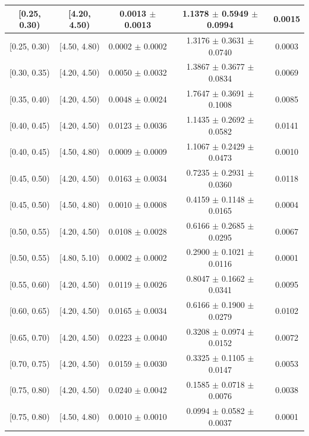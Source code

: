 \begin{longtable}{|c|c|c|c|c|}
\hline
\endlastfoot
[0.25, 0.30) & [4.20, 4.50) & 0.0013 $\pm$ 0.0013 & 1.1378 $\pm$ 0.5949 $\pm$ 0.0994 & 0.0015 \\ 
\hline
[0.25, 0.30) & [4.50, 4.80) & 0.0002 $\pm$ 0.0002 & 1.3176 $\pm$ 0.3631 $\pm$ 0.0740 & 0.0003 \\ 
\hline
[0.30, 0.35) & [4.20, 4.50) & 0.0050 $\pm$ 0.0032 & 1.3867 $\pm$ 0.3677 $\pm$ 0.0834 & 0.0069 \\ 
\hline
[0.35, 0.40) & [4.20, 4.50) & 0.0048 $\pm$ 0.0024 & 1.7647 $\pm$ 0.3691 $\pm$ 0.1008 & 0.0085 \\ 
\hline
[0.40, 0.45) & [4.20, 4.50) & 0.0123 $\pm$ 0.0036 & 1.1435 $\pm$ 0.2692 $\pm$ 0.0582 & 0.0141 \\ 
\hline
[0.40, 0.45) & [4.50, 4.80) & 0.0009 $\pm$ 0.0009 & 1.1067 $\pm$ 0.2429 $\pm$ 0.0473 & 0.0010 \\ 
\hline
[0.45, 0.50) & [4.20, 4.50) & 0.0163 $\pm$ 0.0034 & 0.7235 $\pm$ 0.2931 $\pm$ 0.0360 & 0.0118 \\ 
\hline
[0.45, 0.50) & [4.50, 4.80) & 0.0010 $\pm$ 0.0008 & 0.4159 $\pm$ 0.1148 $\pm$ 0.0165 & 0.0004 \\ 
\hline
[0.50, 0.55) & [4.20, 4.50) & 0.0108 $\pm$ 0.0028 & 0.6166 $\pm$ 0.2685 $\pm$ 0.0295 & 0.0067 \\ 
\hline
[0.50, 0.55) & [4.80, 5.10) & 0.0002 $\pm$ 0.0002 & 0.2900 $\pm$ 0.1021 $\pm$ 0.0116 & 0.0001 \\ 
\hline
[0.55, 0.60) & [4.20, 4.50) & 0.0119 $\pm$ 0.0026 & 0.8047 $\pm$ 0.1662 $\pm$ 0.0341 & 0.0095 \\ 
\hline
[0.60, 0.65) & [4.20, 4.50) & 0.0165 $\pm$ 0.0034 & 0.6166 $\pm$ 0.1900 $\pm$ 0.0279 & 0.0102 \\ 
\hline
[0.65, 0.70) & [4.20, 4.50) & 0.0223 $\pm$ 0.0040 & 0.3208 $\pm$ 0.0974 $\pm$ 0.0152 & 0.0072 \\ 
\hline
[0.70, 0.75) & [4.20, 4.50) & 0.0159 $\pm$ 0.0030 & 0.3325 $\pm$ 0.1105 $\pm$ 0.0147 & 0.0053 \\ 
\hline
[0.75, 0.80) & [4.20, 4.50) & 0.0240 $\pm$ 0.0042 & 0.1585 $\pm$ 0.0718 $\pm$ 0.0076 & 0.0038 \\ 
\hline
[0.75, 0.80) & [4.50, 4.80) & 0.0010 $\pm$ 0.0010 & 0.0994 $\pm$ 0.0582 $\pm$ 0.0037 & 0.0001 \\ 
\hline
\end{longtable}
